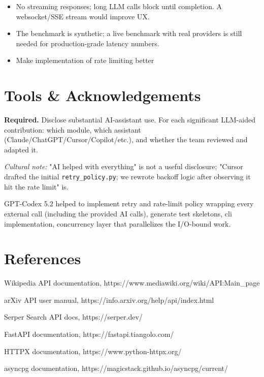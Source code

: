 \documentclass[11pt,a4paper]{article}
\begin{document}
\begin{itemize}[topsep=2pt,itemsep=2pt,leftmargin=2.2em]
  \item No streaming responses; long LLM calls block until completion. A websocket/SSE stream would improve UX.
  \item The benchmark is synthetic; a live benchmark with real providers is still needed for production-grade latency numbers.
  \item Make implementation of rate limiting better
\end{itemize}

\section{Tools \& Acknowledgements}\label{sec:tools}

\begin{deliverbox}
\textbf{Required.} Disclose substantial AI-assistant use. For each significant LLM-aided contribution: which module, which assistant (Claude/ChatGPT/Cursor/Copilot/etc.), and whether the team reviewed and adapted it.
\end{deliverbox}

\begin{probebox}
\textit{Cultural note:} "AI helped with everything" is not a useful disclosure; "Cursor drafted the initial \texttt{retry\_policy.py}; we rewrote backoff logic after observing it hit the rate limit" is.
\end{probebox}

GPT-Codex 5.2 helped to implement retry and rate-limit policy wrapping every external call (including the provided AI calls), generate test skeletons, cli implementation, concurrency layer that parallelizes the I/O-bound work.


\section*{References}

\begin{enumerate}[label={[\arabic*]},leftmargin=2.4em,itemsep=2pt]
  \item Wikipedia API documentation, https://www.mediawiki.org/wiki/API:Main\_page
  \item arXiv API user manual, https://info.arxiv.org/help/api/index.html
  \item Serper Search API docs, https://serper.dev/
  \item FastAPI documentation, https://fastapi.tiangolo.com/
  \item HTTPX documentation, https://www.python-httpx.org/
  \item asyncpg documentation, https://magicstack.github.io/asyncpg/current/
\end{enumerate}
\end{document}
